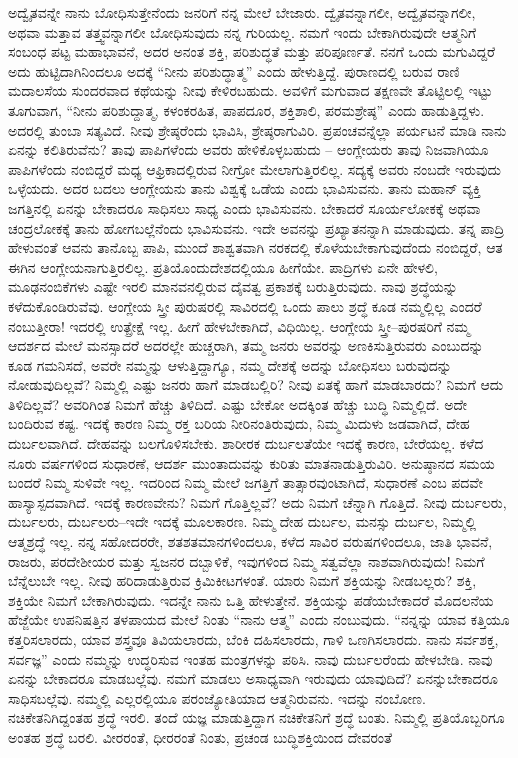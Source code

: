 ಅದ್ವೈತವನ್ನೇ ನಾನು ಬೋಧಿಸುತ್ತೇನೆಂದು ಜನರಿಗೆ ನನ್ನ ಮೇಲೆ ಬೇಜಾರು. ದ್ವೈತವನ್ನಾಗಲೀ, ಅದ್ವೈತವನ್ನಾಗಲೀ, ಅಥವಾ ಮತ್ತಾವ ತತ್ತ್ವವನ್ನಾಗಲೀ ಬೋಧಿಸುವುದು ನನ್ನ ಗುರಿಯಲ್ಲ. ನಮಗೆ ಇಂದು ಬೇಕಾಗಿರುವುದೇ ಆತ್ಮನಿಗೆ ಸಂಬಂಧ ಪಟ್ಟ ಮಹಾಭಾವನೆ, ಅದರ ಅನಂತ ಶಕ್ತಿ, ಪರಿಶುದ್ಧತೆ ಮತ್ತು ಪರಿಪೂರ್ಣತೆ. ನನಗೆ ಒಂದು ಮಗುವಿದ್ದರೆ ಅದು ಹುಟ್ಟಿದಾಗಿನಿಂದಲೂ ಅದಕ್ಕೆ “ನೀನು ಪರಿಶುದ್ಧಾತ್ಮ” ಎಂದು ಹೇಳುತ್ತಿದ್ದೆ. ಪುರಾಣದಲ್ಲಿ ಬರುವ ರಾಣಿ ಮದಾಲಸೆಯ ಸುಂದರವಾದ ಕಥೆಯನ್ನು ನೀವು ಕೇಳಿರಬಹುದು. ಅವಳಿಗೆ ಮಗುವಾದ ತಕ್ಷಣವೇ ತೊಟ್ಟಿಲಲ್ಲಿ ಇಟ್ಟು ತೂಗುವಾಗ, “ನೀನು ಪರಿಶುದ್ದಾತ್ಮ, ಕಳಂಕರಹಿತ, ಪಾಪದೂರ, ಶಕ್ತಿಶಾಲಿ, ಪರಮಶ್ರೇಷ್ಠ” ಎಂದು ಹಾಡುತ್ತಿದ್ದಳು. ಅದರಲ್ಲಿ ತುಂಬಾ ಸತ್ಯವಿದೆ. ನೀವು ಶ್ರೇಷ್ಠರೆಂದು ಭಾವಿಸಿ, ಶ್ರೇಷ್ಠರಾಗುವಿರಿ. ಪ್ರಪಂಚವನ್ನೆಲ್ಲಾ ಪರ್ಯಟನೆ ಮಾಡಿ ನಾನು ಏನನ್ನು ಕಲಿತಿರುವೆನು? ತಾವು ಪಾಪಿಗಳೆಂದು ಅವರು ಹೇಳಿಕೊಳ್ಳಬಹುದು – ಆಂಗ್ಲೇಯರು ತಾವು ನಿಜವಾಗಿಯೂ ಪಾಪಿಗಳೆಂದು ನಂಬಿದ್ದರೆ ಮಧ್ಯ ಆಫ್ರಿಕಾದಲ್ಲಿರುವ ನೀಗ್ರೋ ಮೇಲಾಗುತ್ತಿರಲಿಲ್ಲ. ಸದ್ಯಕ್ಕೆ ಅವರು ನಂಬದೇ ಇರುವುದು ಒಳ್ಳೆಯದು. ಅದರ ಬದಲು ಆಂಗ್ಲೇಯನು ತಾನು ವಿಶ್ವಕ್ಕೆ ಒಡೆಯ ಎಂದು ಭಾವಿಸುವನು. ತಾನು ಮಹಾನ್​ ವ್ಯಕ್ತಿ ಜಗತ್ತಿನಲ್ಲಿ ಏನನ್ನು ಬೇಕಾದರೂ ಸಾಧಿಸಲು ಸಾಧ್ಯ ಎಂದು ಭಾವಿಸುವನು. ಬೇಕಾದರೆ ಸೂರ್ಯಲೋಕಕ್ಕೆ ಅಥವಾ ಚಂದ್ರಲೋಕಕ್ಕೆ ತಾನು ಹೋಗಬಲ್ಲೆನೆಂದು ಭಾವಿಸುವನು. ಇದೇ ಅವನನ್ನು ಪ್ರಖ್ಯಾತನನ್ನಾಗಿ ಮಾಡುವುದು. ತನ್ನ ಪಾದ್ರಿ ಹೇಳುವಂತೆ ಆವನು ತಾನೊಬ್ಬ ಪಾಪಿ, ಮುಂದೆ ಶಾಶ್ವತವಾಗಿ ನರಕದಲ್ಲಿ ಕೊಳೆಯಬೇಕಾಗುವುದೆಂದು ನಂಬಿದ್ದರೆ, ಆತ ಈಗಿನ ಆಂಗ್ಲೇಯನಾಗುತ್ತಿರಲಿಲ್ಲ. ಪ್ರತಿಯೊಂದು\break ದೇಶದಲ್ಲಿಯೂ ಹೀಗೆಯೇ. ಪಾದ್ರಿಗಳು ಏನೇ ಹೇಳಲಿ, ಮೂಢನಂಬಿಕೆಗಳು ಎಷ್ಟೇ ಇರಲಿ ಮಾನವನಲ್ಲಿರುವ ದೈವತ್ವ ಪ್ರಕಾಶಕ್ಕೆ ಬರುತ್ತಿರುವುದು. ನಾವು ಶ್ರದ್ಧೆಯನ್ನು ಕಳೆದುಕೊಂಡಿರುವೆವು. ಆಂಗ್ಲೇಯ ಸ್ತ್ರೀ ಪುರುಷರಲ್ಲಿ ಸಾವಿರದಲ್ಲಿ ಒಂದು ಪಾಲು ಶ್ರದ್ಧೆ ಕೂಡ ನಮ್ಮಲ್ಲಿಲ್ಲ ಎಂದರೆ ನಂಬುತ್ತೀರಾ! ಇದರಲ್ಲಿ ಉತ್ಪ್ರೇಕ್ಷೆ ಇಲ್ಲ. ಹೀಗೆ ಹೇಳಬೇಕಾಗಿದೆ, ವಿಧಿಯಿಲ್ಲ. ಆಂಗ್ಲೇಯ ಸ್ತ್ರೀ–ಪುರಷರಿಗೆ ನಮ್ಮ ಆದರ್ಶದ ಮೇಲೆ ಮನಸ್ಸಾದರೆ ಅದರಲ್ಲೇ ಹುಚ್ಚರಾಗಿ, ತಮ್ಮ ಜನರು ಅವರನ್ನು ಅಣಕಿಸುತ್ತಿರುವರು ಎಂಬುದನ್ನು ಕೂಡ ಗಮನಿಸದೆ, ಅವರೇ ನಮ್ಮನ್ನು ಆಳುತ್ತಿದ್ದಾಗ್ಯೂ, ನಮ್ಮ ದೇಶಕ್ಕೆ ಅದನ್ನು ಬೋಧಿಸಲು ಬರುವುದನ್ನು ನೋಡುವುದಿಲ್ಲವೆ? ನಿಮ್ಮಲ್ಲಿ ಎಷ್ಟು ಜನರು ಹಾಗೆ ಮಾಡಬಲ್ಲಿರಿ? ನೀವು ಏತಕ್ಕೆ ಹಾಗೆ ಮಾಡಬಾರದು? ನಿಮಗೆ ಆದು ತಿಳಿದಿಲ್ಲವೆ? ಅವರಿಗಿಂತ ನಿಮಗೆ ಹೆಚ್ಚು ತಿಳಿದಿದೆ. ಎಷ್ಟು ಬೇಕೋ ಅದಕ್ಕಿಂತ ಹೆಚ್ಚು ಬುದ್ಧಿ ನಿಮ್ಮಲ್ಲಿದೆ. ಅದೇ ಬಂದಿರುವ ಕಷ್ಟ. ಇದಕ್ಕೆ ಕಾರಣ ನಿಮ್ಮ ರಕ್ತ ಬರಿಯ ನೀರಿನಂತಿರುವುದು, ನಿಮ್ಮ ಮಿದುಳು ಜಡವಾಗಿದೆ, ದೇಹ ದುರ್ಬಲವಾಗಿದೆ. ದೇಹವನ್ನು ಬಲಗೊಳಿಸಬೇಕು. ಶಾರೀರಕ ದುರ್ಬಲತೆಯೇ ಇದಕ್ಕೆ ಕಾರಣ, ಬೇರೆಯಲ್ಲ. ಕಳೆದ ನೂರು ವರ್ಷಗಳಿಂದ ಸುಧಾರಣೆ, ಆದರ್ಶ ಮುಂತಾದುವನ್ನು ಕುರಿತು ಮಾತನಾಡುತ್ತಿರುವಿರಿ. ಅನುಷ್ಠಾನದ ಸಮಯ ಬಂದರೆ ನಿಮ್ಮ ಸುಳಿವೇ ಇಲ್ಲ. ಇದರಿಂದ ನಿಮ್ಮ ಮೇಲೆ ಜಗತ್ತಿಗೆ ತಾತ್ಸಾರವುಂಟಾಗಿದೆ, ಸುಧಾರಣೆ ಎಂಬ ಪದವೇ ಹಾಸ್ಯಾಸ್ಪದವಾಗಿದೆ. ಇದಕ್ಕೆ ಕಾರಣವೇನು? ನಿಮಗೆ ಗೊತ್ತಿಲ್ಲವೆ? ಅದು ನಿಮಗೆ ಚೆನ್ನಾಗಿ ಗೊತ್ತಿದೆ. ನೀವು ದುರ್ಬಲರು, ದುರ್ಬಲರು, ದುರ್ಬಲರು–ಇದೇ ಇದಕ್ಕೆ ಮೂಲಕಾರಣ. ನಿಮ್ಮ ದೇಹ ದುರ್ಬಲ, ಮನಸ್ಸು ದುರ್ಬಲ, ನಿಮ್ಮಲ್ಲಿ ಆತ್ಮಶ್ರದ್ಧೆ ಇಲ್ಲ. ನನ್ನ ಸಹೋದರರೇ, ಶತಶತಮಾನಗಳಿಂದಲೂ, ಕಳೆದ ಸಾವಿರ ವರುಷಗಳಿಂದಲೂ, ಜಾತಿ ಭಾವನೆ, ರಾಜರು, ಪರದೇಶೀಯರ ಮತ್ತು ಸ್ವಜನರ ದಬ್ಬಾಳಿಕೆ, ಇವುಗಳಿಂದ ನಿಮ್ಮ ಸತ್ವವೆಲ್ಲಾ ನಾಶವಾಗಿರುವುದು! ನಿಮಗೆ ಬೆನ್ನೆಲುಬೇ ಇಲ್ಲ. ನೀವು ಹರಿದಾಡುತ್ತಿರುವ ಕ್ರಿಮಿಕೀಟಗಳಂತೆ. ಯಾರು ನಿಮಗೆ ಶಕ್ತಿಯನ್ನು ನೀಡಬಲ್ಲರು? ಶಕ್ತಿ, ಶಕ್ತಿಯೇ ನಿಮಗೆ ಬೇಕಾಗಿರುವುದು. ಇದನ್ನೇ ನಾನು ಒತ್ತಿ ಹೇಳುತ್ತೇನೆ. ಶಕ್ತಿಯನ್ನು ಪಡೆಯಬೇಕಾದರೆ ಮೊದಲನೆಯ ಹೆಜ್ಜೆಯೇ ಉಪನಿಷತ್ತಿನ ತಳಪಾಯದ ಮೇಲೆ ನಿಂತು “ನಾನು ಆತ್ಮ” ಎಂದು ನಂಬುವುದು. “ನನ್ನನ್ನು ಯಾವ ಕತ್ತಿಯೂ ಕತ್ತರಿಸಲಾರದು, ಯಾವ ಶಸ್ತ್ರವೂ ತಿವಿಯಲಾರದು, ಬೆಂಕಿ ದಹಿಸಲಾರದು, ಗಾಳಿ ಒಣಗಿಸಲಾರದು. ನಾನು ಸರ್ವಶಕ್ತ, ಸರ್ವಜ್ಞ” ಎಂದು ನಮ್ಮನ್ನು ಉದ್ಧರಿಸುವ ಇಂತಹ ಮಂತ್ರಗಳನ್ನು ಪಠಿಸಿ. ನಾವು ದುರ್ಬಲರೆಂದು ಹೇಳಬೇಡಿ. ನಾವು ಏನನ್ನು ಬೇಕಾದರೂ ಮಾಡಬಲ್ಲೆವು. ನಮಗೆ ಮಾಡಲು ಅಸಾಧ್ಯವಾಗಿ ಇರುವುದು ಯಾವುದಿದೆ? ಏನನ್ನುಬೇಕಾದರೂ ಸಾಧಿಸಬಲ್ಲೆವು. ನಮ್ಮಲ್ಲಿ ಎಲ್ಲರಲ್ಲಿಯೂ ಪರಂಜ್ಯೋತಿಯಾದ ಆತ್ಮನಿರುವನು. ಇದನ್ನು ನಂಬೋಣ. ನಚಿಕೇತನಿಗಿದ್ದಂತಹ ಶ್ರದ್ಧೆ ಇರಲಿ. ತಂದೆ ಯಜ್ಞ ಮಾಡುತ್ತಿದ್ದಾಗ ನಚಿಕೇತನಿಗೆ ಶ್ರದ್ಧೆ ಬಂತು. ನಿಮ್ಮಲ್ಲಿ ಪ್ರತಿಯೊಬ್ಬರಿಗೂ ಅಂತಹ ಶ್ರದ್ಧೆ ಬರಲಿ. ವೀರರಂತೆ, ಧೀರರಂತೆ ನಿಂತು, ಪ್ರಚಂಡ ಬುದ್ಧಿಶಕ್ತಿಯಿಂದ ದೇವರಂತೆ 